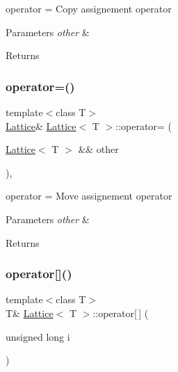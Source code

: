 operator = Copy assignement operator 


\begin{DoxyParams}{Parameters}
{\em other} & \\
\hline
\end{DoxyParams}
\begin{DoxyReturn}{Returns}

\end{DoxyReturn}
\mbox{\label{class_lattice_a29505c3ad95dc2695401c049cc34ba62}} 
\subsubsection{\texorpdfstring{operator=()}{operator=()}\hspace{0.1cm}{\footnotesize\ttfamily [2/2]}}
{\footnotesize\ttfamily template$<$class T$>$ \\
\mbox{\hyperlink{class_lattice}{Lattice}}\& \mbox{\hyperlink{class_lattice}{Lattice}}$<$ T $>$\+::operator= (\begin{DoxyParamCaption}\item[{\mbox{\hyperlink{class_lattice}{Lattice}}$<$ T $>$ \&\&}]{other }\end{DoxyParamCaption})\hspace{0.3cm}{\ttfamily [inline]}, {\ttfamily [noexcept]}}



operator = Move assignement operator 


\begin{DoxyParams}{Parameters}
{\em other} & \\
\hline
\end{DoxyParams}
\begin{DoxyReturn}{Returns}

\end{DoxyReturn}
\mbox{\label{class_lattice_ab7d585cf03c540d70ff91a58facbdef5}} 
\subsubsection{\texorpdfstring{operator[]()}{operator[]()}}
{\footnotesize\ttfamily template$<$class T$>$ \\
T\& \mbox{\hyperlink{class_lattice}{Lattice}}$<$ T $>$\+::operator\mbox{[}$\,$\mbox{]} (\begin{DoxyParamCaption}\item[{unsigned long}]{i }\end{DoxyParamCaption})\hspace{0.3cm}{\ttfamily [inline]}}



